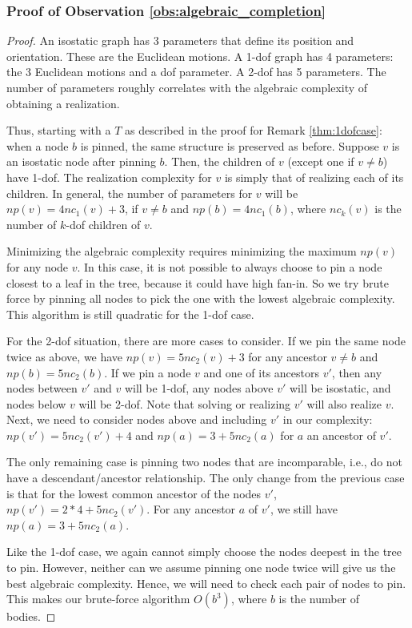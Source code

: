 \subsubsection{Proof of Observation \ref{obs:algebraic_completion}}
\begin{proof}
    An isostatic graph has 3 parameters that define its position and orientation. These are the Euclidean motions. A 1-dof graph has  4 parameters: the 3 Euclidean motions and a dof parameter. A 2-dof has 5 parameters. The number of parameters roughly correlates with the algebraic complexity of obtaining a realization.

    Thus, starting with a $T$ as described in the proof for Remark \ref{thm:1dofcase}: when a node $b$ is pinned, the same structure is preserved as before. Suppose  $v$ is an isostatic node after pinning $b$. Then, the children of $v$ (except one if $v \neq b$) have 1-dof. The realization complexity for $v$ is simply that of realizing each of its children. In general, the number of parameters for $v$  will be $np(v) = 4nc_1(v)+3$, if $v \neq b$ and $np(b) = 4nc_1(b)$, where $nc_k(v)$ is the number of $k$-dof children of $v$.

    Minimizing the algebraic complexity  requires minimizing the maximum $np(v)$ for any node $v$. In this case, it is not possible to always choose to pin a node closest to a leaf in the tree, because it could have high fan-in. So we  try
brute force by pinning all nodes to  pick the one with the lowest algebraic complexity. This algorithm is still quadratic for the 1-dof case.

    For the 2-dof situation, there are more cases to consider. If we pin the same node twice as above, we have $np(v) = 5nc_2(v)+3$ for any ancestor $v \neq b$ and $np(b) = 5nc_2(b)$. If we pin a node $v$ and one of its ancestors $v'$, then any nodes between $v'$ and $v$ will be 1-dof, any nodes above $v'$ will be isostatic, and nodes below $v$ will be 2-dof. Note that solving or realizing $v'$ will also realize $v$.  Next, we need to consider nodes above and including $v'$ in our complexity: $np(v') = 5nc_2(v') + 4$ and $np(a) = 3 + 5nc_2(a)$ for $a$ an ancestor of $v'$.

The only remaining case is pinning two nodes that are incomparable, i.e., do not have a descendant/ancestor relationship. The only change from the previous case is that for the lowest common ancestor of the nodes $v'$, $np(v') = 2*4+5nc_2(v')$. For any ancestor $a$ of $v'$, we still have $np(a) = 3 + 5nc_2(a)$.

    Like the 1-dof case, we again cannot simply choose the nodes deepest in the tree to pin. However, neither can we assume pinning one node twice will give us the best algebraic complexity. Hence, we will need to check each pair of nodes to pin. This makes our brute-force algorithm $O(b^3)$, where $b$ is the number of bodies.
\end{proof}





